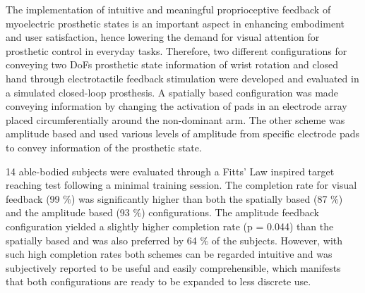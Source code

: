 The implementation of intuitive and meaningful proprioceptive feedback of myoelectric prosthetic states is an important aspect in enhancing embodiment and user satisfaction, hence lowering the demand for visual attention for prosthetic control in everyday tasks. Therefore, two different configurations for conveying two DoFs prosthetic state information of wrist rotation and closed hand through electrotactile feedback stimulation were developed and evaluated in a simulated closed-loop prosthesis. A spatially based configuration was made conveying information by changing the activation of pads in an electrode array placed circumferentially around the non-dominant arm. The other scheme was amplitude based and used various levels of amplitude from specific electrode pads to convey information of the prosthetic state. 

14 able-bodied subjects were evaluated through a Fitts' Law inspired target reaching test following a minimal training session. The completion rate for visual feedback (99 $\%$) was significantly higher than both the spatially based (87 $\%$) and the amplitude based (93 $\%$) configurations. The amplitude feedback configuration yielded a slightly higher completion rate (p = 0.044) than the spatially based and was also preferred by 64 $\%$ of the subjects. However, with such high completion rates both schemes can be regarded intuitive and was subjectively reported to be useful and easily comprehensible, which manifests that both configurations are ready to be expanded to less discrete use.    
